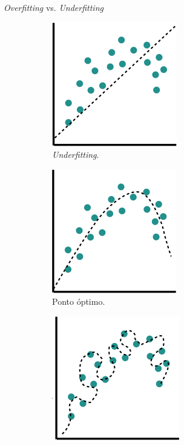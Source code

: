 \begin{frame}{\textit{Overfitting} vs. \textit{Underfitting}}
    \begin{figure}
		\centering
		\begin{subfigure}{0.3\textwidth}
			\centering
			\includegraphics[width=0.7\linewidth]{img/underfit.png}
			\caption{\textit{Underfitting}.}
		\end{subfigure}
	    \begin{subfigure}{0.3\textwidth}
			\centering
			\includegraphics[width=0.7\linewidth]{img/optimal.png}
			\caption{Ponto óptimo.}
		\end{subfigure}
		\begin{subfigure}{0.3\textwidth}
			\centering
			\includegraphics[width=0.7\linewidth]{img/overfit.png}

\end{subfigure}
\end{figure}
\end{frame}
